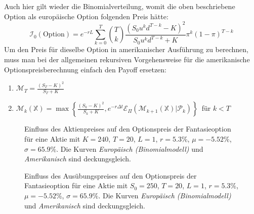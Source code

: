 \documentclass[11pt]{report} %
\begin{document}
Auch hier gilt wieder die Binomialverteilung, womit die oben beschriebene Option als europäische Option folgenden Preis hätte:
$$\mathcal{I}_0(\text{Option})=e^{-rL}\sum_{k=0}^{T}\binom{T}{k}\frac{(S_0u^kd^{T-k}-K)^2}{S_0u^kd^{T-k}+K}\pi^k(1-\pi)^{T-k}$$
Um den Preis für dieselbe Option in amerikanischer Ausführung zu berechnen, muss man bei der allgemeinen rekursiven Vorgehensweise für die amerikanische Optionspreisberechnung einfach den Payoff ersetzen:
\begin{enumerate}
    \item $\mathcal{M}_T=\frac{(S_T-K)^2}{S_T+K}$
    \item $\mathcal{M}_k(\mathbb{X})=\max\left\{\frac{(S_k-K)^2}{S_k+K}, e^{-r\Delta t}\mathcal{E}_\Pi(\mathcal{M}_{k+1}(\mathbb{X})|\mathcal{P}_k)\right\}$\ für $k<T$
\end{enumerate}
\begin{figure}[H]
    \centering
    \caption{Einfluss des Aktienpreises auf den Optionspreis der Fantasieoption für eine Aktie mit $K=240$, $T=20$, $L=1$, $r=5.3\%$, $\mu=-5.52\%$, $\sigma=65.9\%$. Die Kurven \textit{Europäisch (Binomialmodell)} und \textit{Amerikanisch} sind deckungsgleich.}
    \label{fig:S_0-fant}
\end{figure}
\begin{figure}[H]
    \centering
    \caption{Einfluss des Ausübungspreises auf den Optionspreis der Fantasieoption für eine Aktie mit $S_0=250$, $T=20$, $L=1$, $r=5.3\%$, $\mu=-5.52\%$, $\sigma=65.9\%$. Die Kurven \textit{Europäisch (Binomialmodell)} und \textit{Amerikanisch} sind deckungsgleich.}
    \label{fig:K-fant}
\end{figure}
\end{document}
